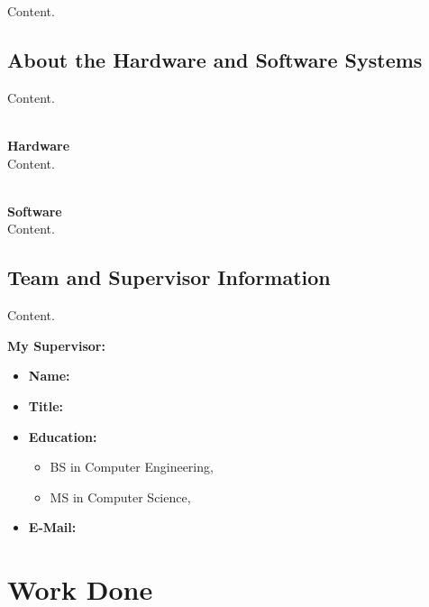 \documentclass[10pt]{article}
\begin{document}
Content.

\subsection{About the Hardware and Software Systems}

Content.

\\ \textbf{Hardware} \\

Content.

\\ \textbf{Software} \\

Content.

\subsection{Team and Supervisor Information}

Content.


\textbf{My Supervisor:}
\begin{itemize}
    \item{\textbf{Name: } }
    \item{\textbf{Title: } }
    \item{\textbf{Education:} }
    \begin{itemize}
        \item{BS in Computer Engineering, }
        \item{MS in Computer Science, }
    \end{itemize}
    \item{\textbf{E-Mail: } }
\end{itemize}

\section{Work Done}
\end{document}
